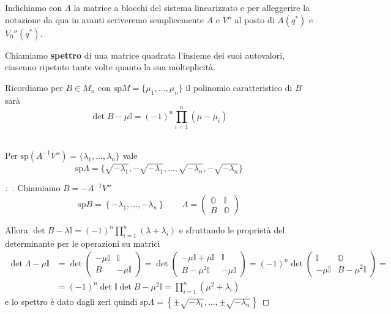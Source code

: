 \documentclass[11pt,a4paper,twoside]{book}
\newenvironment{lemma}[1][\empty]{\begin{Lemma}{
\ifx\empty#1\relax\else\mdseries\itshape#1\\\fi
}{}}{\end{Lemma}}
\newenvironment{dimo}[1][\proofname]{
	\begin{tcolorbox}[
	breakable, 
	enhanced, 
	interior hidden, 
	frame hidden, 
	borderline west = {1pt}{0pt}{gray}, 
	top=0pt, bottom=0pt, left=0pt]
\begin{proof}[#1:~]
}
{
\end{proof}
\end{tcolorbox}
}
\theoremstyle{esss}
\theoremstyle{dotless}
\numberwithin{equation}{section} %
\begin{document}
Indichiamo con $\Lambda$ la matrice a blocchi del sistema linearizzato e per alleggerire la notazione da qua in avanti scriveremo semplicemente $A$ e $V''$ al posto di $A(q^*)$ e $V_0''(q^*)$.

Chiamiamo \textbf{spettro} di una matrice quadrata l'insieme dei suoi autovalori, ciascuno ripetuto tante volte quanto la sua molteplicità.

Ricordiamo per $B\in M_{n}$ con $\text{sp}M=\{\mu_1,\dots,\mu_n\}$ il polinomio caratteristico di $B$ sarà \[\det{B-\mu\mathbb{I}}=(-1)^n\prod_{i=1}^n (\mu-\mu_i)\]


\begin{lemma}\label{lemmaSpettroLambda}
Per $\text{sp}(A^{-1}V'')=\{\lambda_1,\dots,\lambda_n\}$ vale
\[\text{sp}\Lambda=\{\sqrt{-\lambda_1},-\sqrt{-\lambda_1},\dots,\sqrt{-\lambda_n},-\sqrt{-\lambda_n}\}
\]
\end{lemma}
\begin{dimo}
Chiamiamo $B=-A^{-1}V''$ 
\[ \text{sp}B=\left\{-\lambda_1,\dots,-\lambda_n\right\}\qquad \Lambda=\left(\begin{array}{cc}\mathbb{O} & \mathbb{I} \\ B & \mathbb{O} \end{array}\right)
\]

Allora $\det{B-\lambda\mathbb{I}}=(-1)^n\prod_{i=1}^n (\lambda+\lambda_i)$ e sfruttando le proprietà del determinante per le operazioni su matrici
\begin{align*}
\det{\Lambda-\mu\mathbb{I}}&=\det{\left(\begin{array}{cc} -\mu \mathbb{I} & \mathbb{I} \\ B & -\mu\mathbb{I} \end{array}\right)} = \det{\left(\begin{array}{cc} -\mu \mathbb{I}+\mu\mathbb{I} & \mathbb{I} \\ B-\mu^2\mathbb{I} & -\mu\mathbb{I} \end{array}\right)} = (-1)^n\det{\left(\begin{array}{cc} \mathbb{I} & \mathbb{O} \\  -\mu\mathbb{I} & B-\mu^2\mathbb{I} \end{array}\right)} = \\
&= (-1)^n \det{\mathbb{I}}\det{B-\mu^2\mathbb{I}}=\prod_{i=1}^n (\mu^2+\lambda_i)
\end{align*}
e lo spettro è dato dagli zeri quindi $\text{sp}\Lambda=\left\{\pm\sqrt{-\lambda_1},\dots,\pm\sqrt{-\lambda_n}\right\}$\qedhere
\end{dimo}
\end{document}
